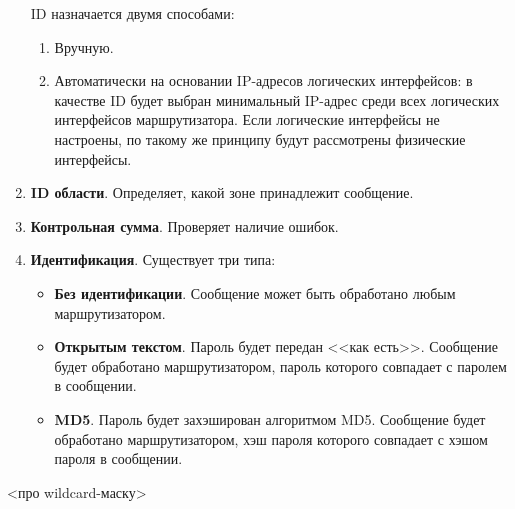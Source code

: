 \begin{enumerate}
          ID назначается двумя способами:
          \begin{enumerate}
              \item Вручную.
              \item Автоматически на основании IP-адресов логических интерфейсов: в качестве ID будет выбран минимальный IP-адрес среди всех логических интерфейсов маршрутизатора. Если логические интерфейсы не настроены, по такому же принципу будут рассмотрены физические интерфейсы.
          \end{enumerate}
    \item \textbf{ID области}. Определяет, какой зоне принадлежит сообщение.
    \item \textbf{Контрольная сумма}. Проверяет наличие ошибок.
    \item \textbf{Идентификация}. Существует три типа:
          \begin{itemize}
              \item \textbf{Без идентификации}. Сообщение может быть обработано любым маршрутизатором.
              \item \textbf{Открытым текстом}. Пароль будет передан <<как есть>>. Сообщение будет обработано маршрутизатором, пароль которого совпадает с паролем в сообщении.
              \item \textbf{MD5}. Пароль будет захэширован алгоритмом MD5. Сообщение будет обработано маршрутизатором, хэш пароля которого совпадает с хэшом пароля в сообщении.
          \end{itemize}
\end{enumerate}

<про wildcard-маску>

